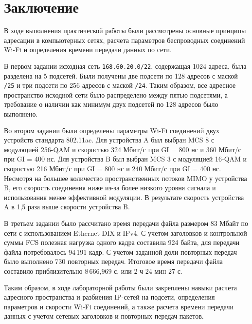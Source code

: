 \newpage
\section*{Заключение}

В ходе выполнения практической работы были рассмотрены основные
принципы адресации в компьютерных сетях, расчета параметров
беспроводных соединений Wi-Fi и определения времени передачи данных
по сети.

В первом задании исходная сеть \texttt{168.60.20.0/22}, содержащая
1024 адреса, была разделена на 5 подсетей. Были получены две подсети
по 128 адресов с маской \texttt{/25} и три подсети по 256 адресов с
маской \texttt{/24}. Таким образом, все адресное пространство
исходной сети было распределено между пятью подсетями, а требование
о наличии как минимум двух подсетей по 128 адресов было выполнено.

Во втором задании были определены параметры Wi-Fi соединений двух
устройств стандарта 802.11ac. Для устройства A был выбран MCS 8 с
модуляцией 256-QAM и скоростью 324 Мбит/с при GI = 800 нс и
360 Мбит/с при GI = 400 нс. Для устройства B был выбран MCS 3 с
модуляцией 16-QAM и скоростью 216 Мбит/с при GI = 800 нс и
240 Мбит/с при GI = 400 нс. Несмотря на большее количество
пространственных потоков MIMO у устройства B, его скорость соединения
ниже из-за более низкого уровня сигнала и использования менее
эффективной модуляции. В результате скорость устройства A в 1,5 раза
выше скорости устройства B.

В третьем задании было рассчитано время передачи файла размером
83 Мбайт по сети с использованием Ethernet DIX и IPv4. С учетом
заголовков и контрольной суммы FCS полезная нагрузка одного кадра
составила 924 байта, для передачи файла потребовалось 94\,191 кадр.
С учетом заданной доли повторных передач было выполнено 730 повторных
передач. Итоговое время передачи файла составило приблизительно
8\,666{,}969 с, или 2 ч 24 мин 27 с.

Таким образом, в ходе лабораторной работы были закреплены навыки
расчета адресного пространства и разбиения IP-сетей на подсети,
определения параметров и скорости Wi-Fi соединений, а также расчета
времени передачи данных с учетом сетевых заголовков и повторных
передач пакетов.